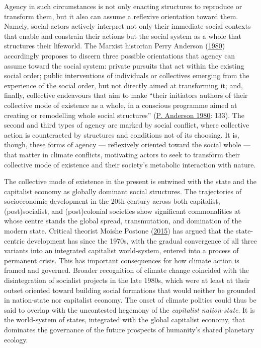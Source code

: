 \documentclass[a4paper, nobind]{templates/ociamthesis}
\begin{document}
Agency in such circumstances is not only enacting structures to reproduce or transform them, but it also can assume a reflexive orientation toward them. Namely, social actors actively interpret not only their immediate social contexts that enable and constrain their actions but the social system as a whole that structures their lifeworld. The Marxist historian Perry Anderson (\protect\hyperlink{ref-anderson_arguments_1980}{1980}) accordingly proposes to discern three possible orientations that agency can assume toward the social system: private pursuits that act within the existing social order; public interventions of individuals or collectives emerging from the experience of the social order, but not directly aimed at transforming it; and, finally, collective endeavours that aim to make ``their initiators authors of their collective mode of existence as a whole, in a conscious programme aimed at creating or remodelling whole social structures'' (\protect\hyperlink{ref-anderson_arguments_1980}{P. Anderson 1980}: 133). The second and third types of agency are marked by social conflict, where collective action is counteracted by structures and conditions not of its choosing. It is, though, these forms of agency --- reflexively oriented toward the social whole --- that matter in climate conflicts, motivating actors to seek to transform their collective mode of existence and their society's metabolic interaction with nature.

The collective mode of existence in the present is entwined with the state and the capitalist economy as globally dominant social structures. The trajectories of socioeconomic development in the 20th century across both capitalist, (post)socialist, and (post)colonial societies show significant commonalities at whose centre stands the global spread, transmutation, and domination of the modern state. Critical theorist Moishe Postone (\protect\hyperlink{ref-postone_task_2015}{2015}) has argued that the state-centric development has since the 1970s, with the gradual convergence of all three variants into an integrated capitalist world-system, entered into a process of permanent crisis. This has important consequences for how climate action is framed and governed. Broader recognition of climate change coincided with the disintegration of socialist projects in the late 1980s, which were at least at their outset oriented toward building social formations that would neither be grounded in nation-state nor capitalist economy. The onset of climate politics could thus be said to overlap with the uncontested hegemony of the \emph{capitalist nation-state}. It is the world-system of states, integrated with the global capitalist economy, that dominates the governance of the future prospects of humanity's shared planetary ecology.
\end{document}
